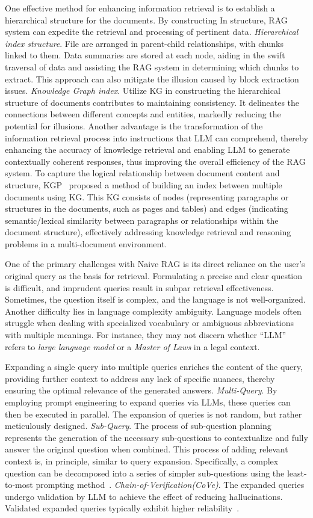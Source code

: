 One effective method for enhancing information retrieval is to establish a hierarchical structure for the documents. By constructing In structure, RAG system can expedite the retrieval and processing of pertinent data.
\emph{Hierarchical index structure}.  File are arranged in parent-child relationships, with chunks linked to them. Data summaries are stored at each node, aiding in the swift traversal of data and assisting the RAG system in determining which chunks to extract. This approach can also mitigate the illusion caused by block extraction issues.
\emph{Knowledge Graph index}. Utilize KG in constructing the hierarchical structure of documents contributes to maintaining consistency. It delineates the connections between different concepts and entities, markedly reducing the potential for illusions. Another advantage is the transformation of the information retrieval process into instructions that LLM can comprehend, thereby enhancing the accuracy of knowledge retrieval and enabling LLM to generate contextually coherent responses, thus improving the overall efficiency of the RAG system. To capture the logical relationship between document content and structure, KGP~ proposed a method of building an index between multiple documents using KG. This KG consists of nodes (representing paragraphs or structures in the documents, such as pages and tables) and edges (indicating semantic/lexical similarity between paragraphs or relationships within the document structure), effectively addressing knowledge retrieval and reasoning problems in a multi-document environment.

One of the primary challenges with Naive RAG is its direct reliance on the user’s original query as the basis for retrieval. Formulating a precise and clear question is difficult, and imprudent queries result in subpar retrieval effectiveness. Sometimes, the question itself is complex, and the language is not well-organized. Another difficulty lies in language complexity  ambiguity. Language models often struggle when dealing with specialized vocabulary or ambiguous abbreviations with multiple meanings. For instance, they may not discern whether “LLM” refers to \textit{large language model} or a \textit{Master of Laws} in a legal context.

Expanding a single query into multiple queries enriches the content of the query, providing further context to address any lack of specific nuances, thereby ensuring the optimal relevance of the generated answers.
\emph{Multi-Query}. By employing prompt engineering to expand queries via LLMs, these queries can then be executed in parallel. The expansion of queries is not random, but rather meticulously designed. 
\emph{Sub-Query}. The process of sub-question planning represents the generation of the necessary sub-questions to contextualize and fully answer the original question when combined. This process of adding relevant context is, in principle, similar to query expansion. Specifically, a complex question can be decomposed into a series of simpler sub-questions using the least-to-most prompting method~.
\emph{Chain-of-Verification(CoVe)}. The expanded queries undergo validation by LLM to achieve the effect of reducing hallucinations. Validated expanded queries typically exhibit higher reliability~.

